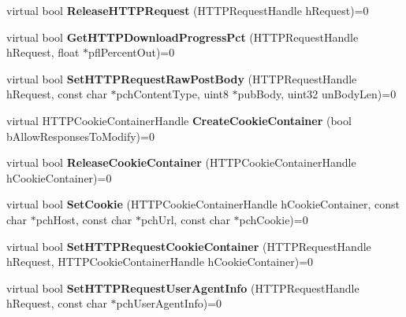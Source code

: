 \begin{DoxyCompactItemize}
\item 
\mbox{\label{class_i_steam_h_t_t_p_ac533533e2d27065ba2f62f6e8252078a}} 
virtual bool {\bfseries Release\+H\+T\+T\+P\+Request} (H\+T\+T\+P\+Request\+Handle h\+Request)=0
\item 
\mbox{\label{class_i_steam_h_t_t_p_a243d9d8761e3bdbfbfc83b1d2f447800}} 
virtual bool {\bfseries Get\+H\+T\+T\+P\+Download\+Progress\+Pct} (H\+T\+T\+P\+Request\+Handle h\+Request, float $\ast$pfl\+Percent\+Out)=0
\item 
\mbox{\label{class_i_steam_h_t_t_p_a00db00fdf21a17f5ca65019d219834a0}} 
virtual bool {\bfseries Set\+H\+T\+T\+P\+Request\+Raw\+Post\+Body} (H\+T\+T\+P\+Request\+Handle h\+Request, const char $\ast$pch\+Content\+Type, uint8 $\ast$pub\+Body, uint32 un\+Body\+Len)=0
\item 
\mbox{\label{class_i_steam_h_t_t_p_ac18346553863fd8c7a448ee88caff3ff}} 
virtual H\+T\+T\+P\+Cookie\+Container\+Handle {\bfseries Create\+Cookie\+Container} (bool b\+Allow\+Responses\+To\+Modify)=0
\item 
\mbox{\label{class_i_steam_h_t_t_p_a4fddec56eeaa93b238698a7ecb02b2a9}} 
virtual bool {\bfseries Release\+Cookie\+Container} (H\+T\+T\+P\+Cookie\+Container\+Handle h\+Cookie\+Container)=0
\item 
\mbox{\label{class_i_steam_h_t_t_p_a98107c488259499b563febac14f1d6f5}} 
virtual bool {\bfseries Set\+Cookie} (H\+T\+T\+P\+Cookie\+Container\+Handle h\+Cookie\+Container, const char $\ast$pch\+Host, const char $\ast$pch\+Url, const char $\ast$pch\+Cookie)=0
\item 
\mbox{\label{class_i_steam_h_t_t_p_a94e927f0b7f06fa79246c6443d5b3629}} 
virtual bool {\bfseries Set\+H\+T\+T\+P\+Request\+Cookie\+Container} (H\+T\+T\+P\+Request\+Handle h\+Request, H\+T\+T\+P\+Cookie\+Container\+Handle h\+Cookie\+Container)=0
\item 
\mbox{\label{class_i_steam_h_t_t_p_a1e774d4620f2168ee123906d823a5646}} 
virtual bool {\bfseries Set\+H\+T\+T\+P\+Request\+User\+Agent\+Info} (H\+T\+T\+P\+Request\+Handle h\+Request, const char $\ast$pch\+User\+Agent\+Info)=0

\end{DoxyCompactItemize}
